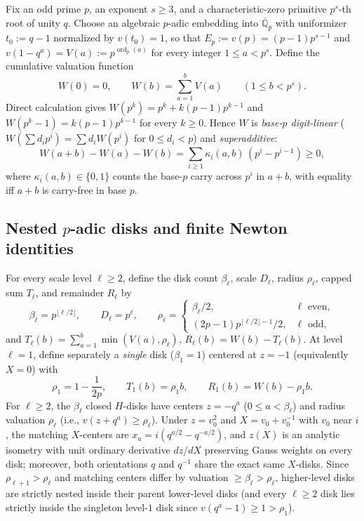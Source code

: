 \documentclass[11pt,reqno]{amsart}
\numberwithin{equation}{section}
\theoremstyle{definition}
\theoremstyle{remark}
\newcommand{\Q}{\mathbb{Q}}
\newcommand{\ord}{\operatorname{ord}}
\begin{document}
Fix an odd prime $p$, an exponent $s\ge 3$, and a characteristic-zero primitive $p^s$-th root of unity $q$. Choose an algebraic $p$-adic embedding into $\overline{\Q}_p$ with uniformizer $t_0 := q-1$ normalized by $v(t_0) = 1$, so that $E_p := v(p) = (p-1)p^{s-1}$ and $v(1-q^a) = V(a) := p^{\ord_p(a)}$ for every integer $1\le a < p^s$. Define the cumulative valuation function
\begin{equation}
\label{eq:VW-def}
W(0)=0,\qquad W(b) = \sum_{a=1}^b V(a) \qquad (1\le b < p^s).
\end{equation}
Direct calculation gives $W(p^k) = p^k + k(p-1)p^{k-1}$ and $W(p^k-1) = k(p-1)p^{k-1}$ for every $k\ge 0$. Hence $W$ is \emph{base-$p$ digit-linear} ($W(\sum d_i p^i) = \sum d_i W(p^i)$ for $0\le d_i<p$) and \emph{superadditive}:
\begin{equation}
\label{eq:W-superadd}
W(a+b) - W(a) - W(b) = \sum_{i\ge 1} \kappa_i(a,b)\,(p^i - p^{i-1}) \ge 0,
\end{equation}
where $\kappa_i(a,b)\in\{0,1\}$ counts the base-$p$ carry across $p^i$ in $a+b$, with equality iff $a+b$ is carry-free in base $p$.

\subsection{Nested $p$-adic disks and finite Newton identities}

For every scale level $\ell\ge 2$, define the disk count $\beta_\ell$, scale $D_\ell$, radius $\rho_\ell$, capped sum $T_\ell$, and remainder $R_\ell$ by
\begin{equation}
\label{eq:level-def}
\beta_\ell = p^{\lfloor \ell/2\rfloor},\qquad D_\ell = p^\ell,\qquad
\rho_\ell = \begin{cases} \beta_\ell/2, & \ell\text{ even},\\ (2p-1)p^{\lfloor \ell/2\rfloor - 1}/2, & \ell\text{ odd},\end{cases}
\end{equation}
and $T_\ell(b) = \sum_{a=1}^b \min(V(a),\rho_\ell)$, $R_\ell(b) = W(b) - T_\ell(b)$. At level $\ell=1$, define separately a \emph{single} disk ($\beta_1=1$) centered at $z=-1$ (equivalently $X=0$) with
\begin{equation}
\label{eq:level1-def}
\rho_1 = 1 - \frac{1}{2p},\qquad T_1(b) = \rho_1 b,\qquad R_1(b) = W(b) - \rho_1 b.
\end{equation}
For $\ell\ge 2$, the $\beta_\ell$ closed $H$-disks have centers $z = -q^a$ ($0\le a < \beta_\ell$) and radius valuation $\rho_\ell$ (i.e., $v(z+q^a)\ge\rho_\ell$). Under $z = v_0^2$ and $X = v_0 + v_0^{-1}$ with $v_0$ near $i$, the matching $X$-centers are $x_a = i(q^{a/2}-q^{-a/2})$, and $z(X)$ is an analytic isometry with unit ordinary derivative $dz/dX$ preserving Gauss weights on every disk; moreover, both orientations $q$ and $q^{-1}$ share the exact same $X$-disks. Since $\rho_{\ell+1} > \rho_\ell$ and matching centers differ by valuation $\ge \beta_\ell > \rho_\ell$, higher-level disks are strictly nested inside their parent lower-level disks (and every $\ell\ge 2$ disk lies strictly inside the singleton level-$1$ disk since $v(q^a-1)\ge 1 > \rho_1$).
\end{document}
